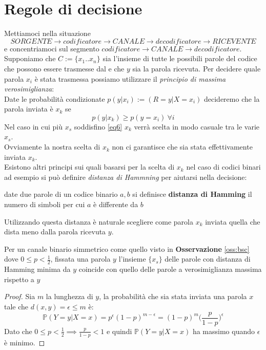 \section{Regole di decisione}
Mettiamoci nella situazione
$$ SORGENTE \to codificatore \to CANALE \to decodificatore \to RICEVENTE$$
e concentriamoci sul segmento $codificatore \to CANALE \to decodificatore$.\\
Supponiamo che $C:=\{ x_1 ..x_n \}$ sia l'insieme di tutte le possibili parole del codice che possono essere trasmesse dal e che $y$ sia la parola ricevuta. Per decidere quale parola $x_i$ è stata trasmessa possiamo utilizzare il \textit{principio di massima verosimiglianza}:\\
Date le probabilità condizionate $p(y|x_i):=(R=y|X=x_i)$ decideremo che la parola inviata è $x_k$ se
\begin{equation} \label{eq6}
p(y|x_k )\geq p(y=x_i) \ \forall i
\end{equation}
Nel caso in cui più $x_s$ soddisfino \ref{eq6} $x_k$ verrà scelta in modo casuale tra le varie $x_s$.\\
Ovviamente la nostra scelta di $x_k$ non ci garantisce che sia stata effettivamente inviata $x_k$.\\
Esistono altri principi sui quali basarsi per la scelta di $x_k$ nel caso di codici binari ad esempio si può definire \textit{distanza di Hammning} per aiutarsi nella decisione:
\begin{defi}
date due parole di un codice binario $a,b$ si definisce \textbf{distanza di Hamming} il numero di simboli per cui $a$ è differente da $b$
\end{defi}
Utilizzando questa distanza è naturale scegliere come parola $x_k$ inviata quella che dista meno dalla parola ricevuta $y$.

\begin{teo}
Per un canale binario simmetrico come quello visto in \textbf{Osservazione} \ref{oss:bsc} dove $0 \leq p < \frac{1}{2}$, fissata una parola $y$ l'insieme $\{ x_s \}$ delle parole con distanza di Hamming minima da $y$ coincide con quello delle parole a verosimiglianza massima rispetto a $y$
\end{teo}
\begin{proof}
Sia $m$ la lunghezza di $y$, la probabilità che sia stata inviata una parola $x$ tale che $d(x,y)=\epsilon \leq m$ è:
$$\mathbb{P}(Y=y|X=x)= p^{\epsilon}(1-p)^{m-\epsilon}=(1-p)^m \bigg( \frac{p}{1-p} \bigg)^{\epsilon}$$
Dato che $0 \leq p < \frac{1}{2} \implies \frac{p}{1-p}<1 $ e quindi $\mathbb{P}(Y=y|X=x)$ ha massimo quando $\epsilon$ è minimo.
\end{proof}







